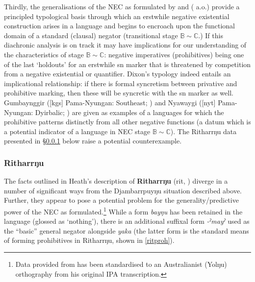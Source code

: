 { Thirdly, the generalisations of the \acrshort{NEC} as formulated by \citet{Croft1991} and \citeauthor{Veselinova2016} (\citeyear{Veselinova2016} a.o.) provide a principled typological basis through which an erstwhile negative existential construction arises in a language and begins to encroach upon the functional domain of a standard (clausal) negator (transitional stage $\mathbb{B\sim C}$.) If this diachronic analysis is on track it may have implications for our understanding of the characteristics of stage $\mathbb{B\sim C}$: negative imperatives (prohibitives) being one of the last `holdouts' for an erstwhile \acrshort{sn} marker that is threatened by competition from a negative existential or quantifier. %
 Dixon's typology \citeyearpar[84]{Dixon2002a} indeed entails an implicational relationship: if there is formal syncretism between privative and prohibitive marking, then these will be syncretic with the \gls{sn} marker as well. Gumbaynggir ([\gls{kgs}] Pama-Nyungan: Southeast; \citealt{Eades1979}) and Nyawaygi ([\gls{nyt}] Pama-Nyungan: Dyirbalic; \citealt{Dixon1983}) are given as examples of a languages for which the prohibitive patterns distinctly from all other negative functions (a datum which is a potential indicator of a language in \acrshort{NEC} stage $\mathbb{B\sim C}$). The Ritharrŋu data presented in §\ref{secrit} below raise a potential counterexample.
\label{secdjr}

\subsubsection{Ritharrŋu}\label{secrit}


The facts outlined in Heath's description of {\bf Ritharrŋu} (\gls{rit}, \citeyear{Heath1980}) diverge in a number of significant ways from the Djambarrpuyŋu situation described above. Further, they appear to pose a potential problem for the generality/predictive power of the \acrshort{NEC} as formulated.\footnote{Data provided from \citet{Heath1980} has been standardised to an Australianist (Yolŋu) orthography from his original IPA transcription.} While a form \textit{bayŋu} has been retained in the language (glossed as `nothing'), there is an additional suffixal form \textit{-ˀmayˀ} used as the ``basic'' \citep[101]{Heath1980} general negator alongside \textit{yaka} (the latter form is the standard means of forming prohibitives in Ritharrŋu, shown in \ref{ritproh}).

}
